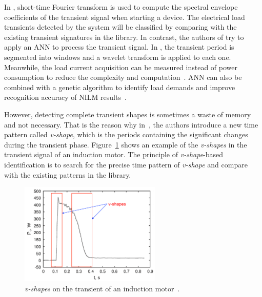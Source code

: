 In \cite{Shaw08,Cox06}, short-time Fourier transform is used to compute the spectral envelope coefficients of the transient signal when starting a device. The electrical load transients detected by the system will be classified by comparing with the existing transient signatures in the library.
In contrast, the authors of \cite{Yang07,Lin10,Chang11} try to apply an ANN to process the transient signal. In \cite{Yang07}, the transient period is segmented into windows and a wavelet transform is applied to each one. Meanwhile, the load current acquisition can be measured instead of power consumption to reduce the complexity and computation~\cite{Lin10}. ANN can also be combined with a genetic algorithm to identify load demands and improve recognition accuracy of NILM results~\cite{Chang11}. 

However, detecting complete transient shapes is sometimes a waste of memory and not necessary. That is the reason why in~\cite{Leeb95PD}, the authors introduce a new time pattern called \textit{v-shape}, which is the periods containing the significant changes during the transient phase. Figure~\ref{fig:A15} shows an example of the \textit{v-shapes} in the transient signal of an induction motor. The principle of \textit{v-shape}-based identification is to search for the precise time pattern of \textit{v-shape} and compare with the existing patterns in the library.
\begin{figure}[!ht]
\centering
\includegraphics[width=0.6\textwidth]{./chapters/chapter2/images/v-shape.pdf} 
\caption{\textit{v-shapes} on the transient of an induction motor~\cite{Leeb95PD}.} 
\label{fig:A15} 
\end{figure}


